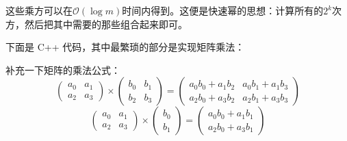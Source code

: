 \documentclass[UTF8,12pt]{ctexart}
\begin{document}
这些乘方可以在$\mathcal{O}(\log m)$时间内得到。这便是快速幂的思想：计算所有的$2^k$次方，然后把其中需要的那些组合起来即可。

下面是 C++ 代码，其中最繁琐的部分是实现矩阵乘法：



补充一下矩阵的乘法公式：
\[\begin{pmatrix}a_0&a_1\\a_2&a_3\end{pmatrix}\times\begin{pmatrix}b_0&b_1\\b_2&b_3\end{pmatrix}=\begin{pmatrix}a_0b_0+a_1b_2&a_0b_1+a_1b_3\\a_2b_0+a_3b_2&a_2b_1+a_3b_3\end{pmatrix}\]
\[\begin{pmatrix}a_0&a_1\\a_2&a_3\end{pmatrix}\times\begin{pmatrix}b_0\\b_1\end{pmatrix}=\begin{pmatrix}a_0b_0+a_1b_1\\a_2b_0+a_3b_1\end{pmatrix}\]
\end{document}
